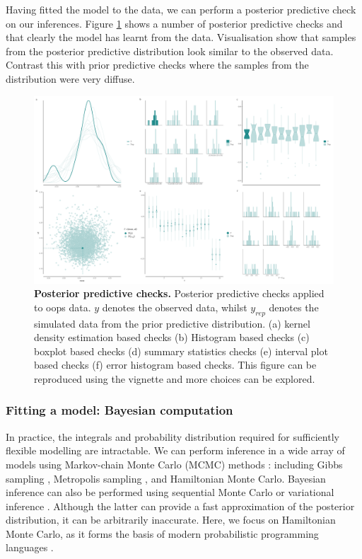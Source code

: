 \documentclass[12pt,english, journal=jpr, layout=twocolumn]{article}
\begin{document}
Having fitted the model to the data, we can perform a posterior predictive check on our inferences. Figure \ref{figure::figure3} shows a number of posterior predictive checks and that clearly the model has learnt from the data. Visualisation show that samples from the posterior predictive distribution look similar to the observed data. Contrast this with prior predictive checks where the samples from the distribution were very diffuse.

\begin{figure}[h!]
	\centering
	\includegraphics[width =1\textwidth]{posteriorpredictivechecks.pdf}
	\caption{\textbf{Posterior predictive checks.} Posterior predictive checks applied to oops data. $y$ denotes the observed data, whilst $y_{rep}$ denotes the simulated data from the prior predictive distribution. (a) kernel density estimation based checks (b) Histogram based checks (c) boxplot based checks (d) summary statistics checks (e) interval plot based checks (f) error histogram based checks. This figure can be reproduced using the vignette and more choices can be explored.}
	\label{figure::figure3}
\end{figure}

\subsubsection{Fitting a model: Bayesian computation}
In practice, the integrals and probability distribution required for sufficiently flexible modelling are intractable. We can perform inference in a wide array of models using Markov-chain Monte Carlo (MCMC) methods \citep{Gilks::1995, Brooks::2011}: including Gibbs sampling \citep{Smith::1993, Gelfand::2000}, Metropolis sampling \citep{Robert::1999}, and Hamiltonian Monte Carlo\citep{Hoffman::2014}. Bayesian inference can also be performed using sequential Monte Carlo \citep{Del::2006} or variational inference \citep{Blei::2017}. Although the latter can provide a fast approximation of the posterior distribution, it can be arbitrarily inaccurate. Here, we focus on Hamiltonian Monte Carlo, as it forms the basis of modern probabilistic programming languages \citep{Carpenter::2017}. 
\end{document}
